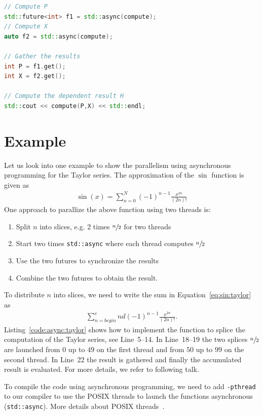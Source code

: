 \documentclass[11pt,fleqn]{book} %
\begin{document}
\begin{lstlisting}[language=c++,caption={Asynchronous execution of the dependency graph.\label{code:serial:dependency}},float,floatplacement=tb]
// Compute P
std::future<int> f1 = std::async(compute);
// Compute X
auto f2 = std::async(compute);

// Gather the results
int P = f1.get();
int X = f2.get();

// Compute the dependent result H
std::cout << compute(P,X) << std::endl;
\end{lstlisting}

\section*{Example}
Let us look into one example to show the parallelism using asynchronous programming for the Taylor series. The approximation of the $\sin$ function is given as
\begin{align}
\sin(x) = \sum\limits_{n=0}^N (-1)^{n-1} \frac{x^{2n}}{(2n)!} 
\label{eq:sin:taylor}
\end{align}
One approach to parallize the above function using two threads is:
\begin{enumerate}
\item Split $n$ into slices, e.g. 2 times $\sfrac{n}{2}$ for two threads
\item Start two times \lstinline|std::async| where each thread computes $\sfrac{n}{2}$
\item Use the two futures to synchronize the results
\item Combine the two futures to obtain the result.
\end{enumerate}
To distribute $n$ into slices, we need to write the sum in Equation~\eqref{eq:sin:taylor} as
\begin{align}
\sum\limits_{n=begin}^end (-1)^{n-1} \frac{x^{2n}}{(2n)!} \text{.}
\end{align}
Listing~\ref{code:async:taylor} shows how to implement the function to splice the computation of the Taylor series, see Line~5--14. In Line~18--19 the two splices $\sfrac{n}{2}$ are launched from $0$ up to $49$ on the first thread and from $50$ up to $99$ on the second thread. In Line~22 the result is gathered and finally the accumulated result is evaluated. For more details, we refer to following talk.

To compile the code using asynchronous programming, we need to add \lstinline|-pthread| to our compiler to use the POSIX threads to launch the functions asynchronous (\lstinline|std::async|). More details about POSIX threads~\cite{butenhof1997programming,kleiman1996programming}.
\end{document}
